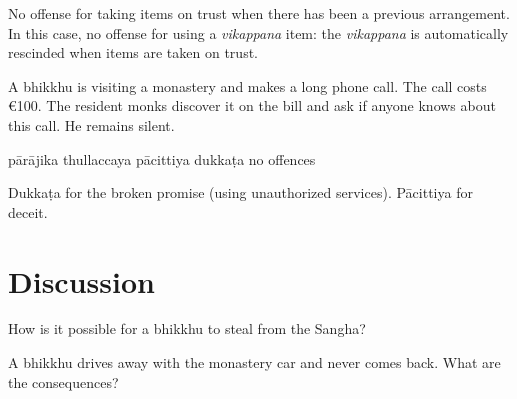 \begin{exam}{\autoExamName}
\begin{problem*}
\begin{parts}
  \begin{solution}
    No offense for taking items on trust when there has been a previous
    arrangement. In this case, no offense for using a \textit{vikappana} item:
    the \emph{vikappana} is automatically rescinded when items are taken on
    trust.
  \end{solution}

  \item A bhikkhu is visiting a monastery and makes a long phone call. The call
  costs €100. The resident monks discover it on the bill and ask if
  anyone knows about this call. He remains silent.

  \bigskip

  \begin{answers}{5}
    \bChoices
     pārājika\eAns
     thullaccaya\eAns
     pācittiya\eAns
     dukkaṭa\eAns
     no offences\eAns
    \eChoices
  \end{answers}

  \begin{solution}
    Dukkaṭa for the broken promise (using unauthorized services). Pācittiya for deceit.
  \end{solution}

\end{parts}

\end{problem*}

\end{exam}

\section*{Discussion}

How is it possible for a bhikkhu to steal from the Sangha?

\bigskip

A bhikkhu drives away with the monastery car and never comes back.
What are the consequences?

